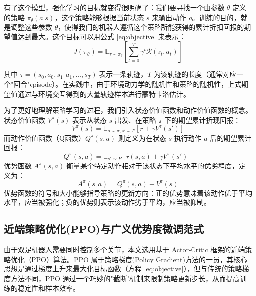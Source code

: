 有了这个模型，强化学习的目标就变得很明确了：我们要寻找一个由参数 $\theta$ 定义的策略 $\pi_{\theta}(a|s)$，这个策略能够根据当前状态 $s$ 来输出动作 $a$。训练的目的，就是调整这些参数 $\theta$，使得我们的机器人遵循这个策略所能获得的累计折扣回报的期望值达到最大。这个目标可以用公式 \eqref{eq:objective} 来表示：
\begin{equation}
J(\pi_{\theta})=\mathbb{E}_{\tau\sim\pi_{\theta}}\left[\sum_{t=0}^{T}\gamma^{t}\mathcal{R}(s_{t},a_{t})\right]
\label{eq:objective}
\end{equation}

其中 $\tau = (s_0, a_0, s_1, a_1, \ldots, s_T)$ 表示一条轨迹，$T$ 为该轨迹的长度（通常对应一个"回合"episode）。在实践中，由于环境动力学的随机性和策略的随机性，上式期望值通过与环境交互得到的大量轨迹样本进行蒙特卡洛估计。

为了更好地理解策略学习的过程，我们引入状态价值函数和动作价值函数的概念。状态价值函数 $V^\pi(s)$ 表示从状态 $s$ 出发、在策略 $\pi$ 下的期望累计折现回报：
\begin{equation}
V^\pi(s) = \mathbb{E}_{a \sim \pi, s' \sim P}\left[r + \gamma V^\pi(s')\right]
\label{eq:value_function}
\end{equation}
而动作价值函数（Q函数）$Q^\pi(s,a)$ 则定义为在状态 $s$ 执行动作 $a$ 后的期望累计回报：
\begin{equation}
Q^\pi(s,a) = \mathbb{E}_{s' \sim P}\left[r(s,a) + \gamma V^\pi(s')\right]
\label{eq:action_value}
\end{equation}
优势函数 $A^\pi(s,a)$ 衡量某个特定动作相对于该状态下平均水平的优劣程度，定义为：
\begin{equation}
A^\pi(s,a) = Q^\pi(s,a) - V^\pi(s)
\end{equation}
优势函数的符号和大小能够指导策略的更新方向：正的优势意味着该动作优于平均水平，应当被强化；负的优势则表示该动作劣于平均，应当被抑制。


\subsection{近端策略优化(PPO)与广义优势度微调范式}
由于双足机器人需要同时控制多个关节，本文选用基于 Actor-Critic 框架的近端策略优化（PPO）算法\cite{Schulman2017PPO}。PPO 属于策略梯度(Policy Gradient)方法的一员，其核心思想是通过梯度上升来最大化目标函数（方程 \ref{eq:objective}），但与传统的策略梯度方法不同，PPO 通过一个巧妙的"截断"机制来限制策略更新步长，从而提高训练的稳定性和样本效率。

